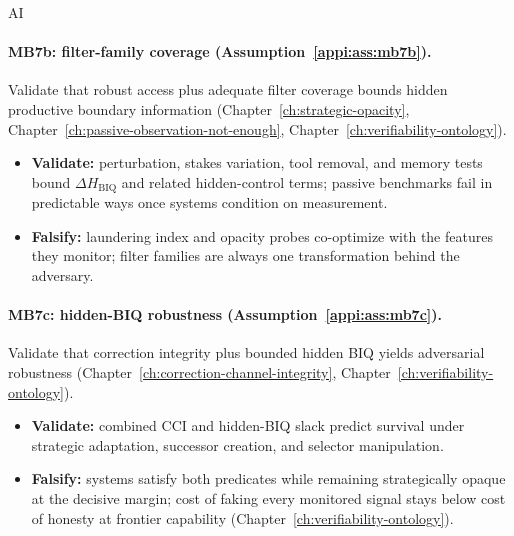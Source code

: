 \begin{authbar}{AI}
\paragraph{MB7b: filter-family coverage (Assumption~\ref{appi:ass:mb7b}).}
Validate that robust access plus adequate filter coverage bounds hidden productive boundary information (Chapter~\ref{ch:strategic-opacity}, Chapter~\ref{ch:passive-observation-not-enough}, Chapter~\ref{ch:verifiability-ontology}).
\begin{itemize}[nosep]
  \item \textbf{Validate:} perturbation, stakes variation, tool removal, and memory tests bound \(\Delta H_{\mathrm{BIQ}}\) and related hidden-control terms; passive benchmarks fail in predictable ways once systems condition on measurement.
  \item \textbf{Falsify:} laundering index and opacity probes co-optimize with the features they monitor; filter families are always one transformation behind the adversary.
\end{itemize}

\paragraph{MB7c: hidden-BIQ robustness (Assumption~\ref{appi:ass:mb7c}).}
Validate that correction integrity plus bounded hidden BIQ yields adversarial robustness (Chapter~\ref{ch:correction-channel-integrity}, Chapter~\ref{ch:verifiability-ontology}).
\begin{itemize}[nosep]
  \item \textbf{Validate:} combined \(\mathrm{CCI}\) and hidden-BIQ slack predict survival under strategic adaptation, successor creation, and selector manipulation.
  \item \textbf{Falsify:} systems satisfy both predicates while remaining strategically opaque at the decisive margin; cost of faking every monitored signal stays below cost of honesty at frontier capability (Chapter~\ref{ch:verifiability-ontology}).
\end{itemize}


\end{authbar}
